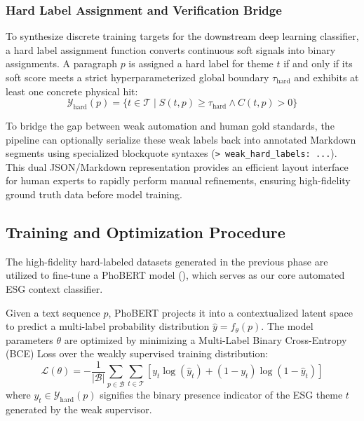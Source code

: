 \documentclass{article}
\theoremstyle{plain}
\theoremstyle{definition}
\theoremstyle{remark}
\begin{document}
\subsubsection{Hard Label Assignment and Verification Bridge}
To synthesize discrete training targets for the downstream deep learning classifier, a hard label assignment function converts continuous soft signals into binary assignments. A paragraph $p$ is assigned a hard label for theme $t$ if and only if its soft score meets a strict hyperparameterized global boundary $\tau_{\text{hard}}$ and exhibits at least one concrete physical hit:
\begin{equation}
\mathcal{Y}_{\text{hard}}(p) = \{ t \in \mathcal{T} \mid S(t, p) \geq \tau_{\text{hard}} \land C(t, p) > 0 \}
\end{equation}

To bridge the gap between weak automation and human gold standards, the pipeline can optionally serialize these weak labels back into annotated Markdown segments using specialized blockquote syntaxes (\texttt{> weak\_hard\_labels: ...}). This dual JSON/Markdown representation provides an efficient layout interface for human experts to rapidly perform manual refinements, ensuring high-fidelity ground truth data before model training.

\subsection{Training and Optimization Procedure}
The high-fidelity hard-labeled datasets generated in the previous phase are utilized to fine-tune a PhoBERT model (), which serves as our core automated ESG context classifier. 

Given a text sequence $p$, PhoBERT projects it into a contextualized latent space to predict a multi-label probability distribution $\hat{y} = f_{\theta}(p)$. The model parameters $\theta$ are optimized by minimizing a Multi-Label Binary Cross-Entropy (BCE) Loss over the weakly supervised training distribution:
\begin{equation}
\label{eq:objective}
\mathcal{L}(\theta) = - \frac{1}{|\mathcal{B}|} \sum_{p \in \mathcal{B}} \sum_{t \in \mathcal{T}} \left[ y_{t} \log(\hat{y}_{t}) + (1 - y_{t}) \log(1 - \hat{y}_{t}) \right]
\end{equation}
where $y_{t} \in \mathcal{Y}_{\text{hard}}(p)$ signifies the binary presence indicator of the ESG theme $t$ generated by the weak supervisor.
\end{document}
